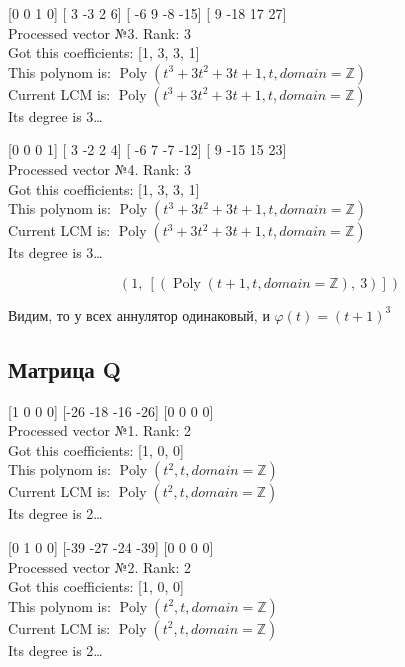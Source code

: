 \documentclass[12pt, a4paper]{article}
\begin{document}
    [0 0 1 0] [ 3 -3  2  6] [ -6   9  -8 -15] [  9 -18  17  27] \\
    Processed vector №3. Rank: 3\\
    Got this coefficients: [1, 3, 3, 1]\\
    This polynom is: $\operatorname{Poly}{\left( t^{3} + 3 t^{2} + 3 t + 1, t, domain=\mathbb{Z} \right)}$\\
    Current LCM is: $\operatorname{Poly}{\left( t^{3} + 3 t^{2} + 3 t + 1, t, domain=\mathbb{Z} \right)}$\\
    Its degree is 3…

    [0 0 0 1] [ 3 -2  2  4] [ -6   7  -7 -12] [  9 -15  15  23] \\
    Processed vector №4. Rank: 3\\
    Got this coefficients: [1, 3, 3, 1]\\
    This polynom is: $\operatorname{Poly}{\left( t^{3} + 3 t^{2} + 3 t + 1, t, domain=\mathbb{Z} \right)}$\\
    Current LCM is: $\operatorname{Poly}{\left( t^{3} + 3 t^{2} + 3 t + 1, t, domain=\mathbb{Z} \right)}$\\
    Its degree is 3…

    \begin{equation}\left( 1, \  \left[ \left( \operatorname{Poly}{\left( t + 1, t, domain=\mathbb{Z} \right)}, \  3\right)\right]\right)\end{equation}

    Видим, то у всех аннулятор одинаковый, и $\varphi(t) = (t + 1)^3$

    \subsection{Матрица Q}

    [1 0 0 0] [-26 -18 -16 -26] [0 0 0 0] \\
    Processed vector №1. Rank: 2\\
    Got this coefficients: [1, 0, 0]\\
    This polynom is: $\operatorname{Poly}{\left( t^{2}, t, domain=\mathbb{Z} \right)}$\\
    Current LCM is: $\operatorname{Poly}{\left( t^{2}, t, domain=\mathbb{Z} \right)}$\\
    Its degree is 2…

    [0 1 0 0] [-39 -27 -24 -39] [0 0 0 0] \\
    Processed vector №2. Rank: 2\\
    Got this coefficients: [1, 0, 0]\\
    This polynom is: $\operatorname{Poly}{\left( t^{2}, t, domain=\mathbb{Z} \right)}$\\
    Current LCM is: $\operatorname{Poly}{\left( t^{2}, t, domain=\mathbb{Z} \right)}$\\
    Its degree is 2…
\end{document}
